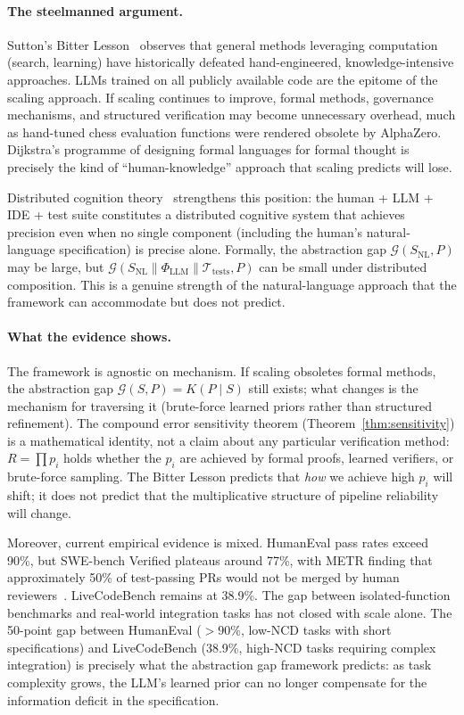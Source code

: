 \documentclass[11pt, a4paper, logo, copyright]{googledeepmind}
\begin{document}
\paragraph{The steelmanned argument.}
Sutton's Bitter Lesson~\citep{sutton2019bitter} observes that general methods
leveraging computation (search, learning) have historically defeated
hand-engineered, knowledge-intensive approaches.  LLMs trained on all publicly
available code are the epitome of the scaling approach.  If scaling continues to
improve, formal methods, governance mechanisms, and structured verification may
become unnecessary overhead, much as hand-tuned chess evaluation functions were
rendered obsolete by AlphaZero.  Dijkstra's programme of designing formal
languages for formal thought is precisely the kind of ``human-knowledge''
approach that scaling predicts will lose.

Distributed cognition theory~\citep{hutchins1995cognition, clark2003natural}
strengthens this position: the human + LLM + IDE + test suite constitutes a
distributed cognitive system that achieves precision even when no single
component (including the human's natural-language specification) is precise
alone.  Formally, the abstraction gap $\mathcal{G}(S_{\text{NL}}, P)$ may be
large, but $\mathcal{G}(S_{\text{NL}} \parallel \Phi_{\text{LLM}} \parallel
\mathcal{T}_{\text{tests}}, P)$ can be small under distributed composition.
This is a genuine strength of the natural-language approach that the framework
can accommodate but does not predict.

\paragraph{What the evidence shows.}
The framework is agnostic on mechanism.  If scaling obsoletes formal methods,
the abstraction gap $\mathcal{G}(S, P) = K(P \mid S)$ still exists; what
changes is the mechanism for traversing it (brute-force learned priors rather
than structured refinement).  The compound error sensitivity theorem
(Theorem~\ref{thm:sensitivity}) is a mathematical identity, not a claim about
any particular verification method: $R = \prod p_i$ holds whether the $p_i$ are
achieved by formal proofs, learned verifiers, or brute-force sampling.  The
Bitter Lesson predicts that \emph{how} we achieve high $p_i$ will shift; it
does not predict that the multiplicative structure of pipeline reliability will
change.

Moreover, current empirical evidence is mixed.  HumanEval pass rates exceed
90\%, but SWE-bench Verified plateaus around 77\%, with METR finding that
approximately 50\% of test-passing PRs would not be merged by human
reviewers~\citep{metr2026swebench}.  LiveCodeBench remains at 38.9\%.  The gap
between isolated-function benchmarks and real-world integration tasks has not
closed with scale alone.  The 50-point gap between HumanEval ($> 90\%$, low-NCD
tasks with short specifications) and LiveCodeBench (38.9\%, high-NCD tasks
requiring complex integration) is precisely what the abstraction gap framework
predicts: as task complexity grows, the LLM's learned prior can no longer
compensate for the information deficit in the specification.
\end{document}
